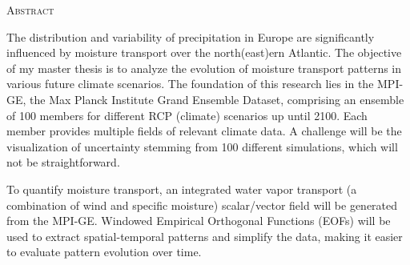 \begin{center}
  \textsc{Abstract}
\end{center}
%
\noindent
%
The distribution and variability of precipitation in Europe are significantly influenced by moisture transport over the north(east)ern Atlantic.
The objective of my master thesis is to analyze the evolution of moisture transport patterns in various future climate scenarios.
The foundation of this research lies in the MPI-GE, the Max Planck Institute Grand Ensemble Dataset, comprising an ensemble of 100 members for different RCP (climate) scenarios up until 2100.
Each member provides multiple fields of relevant climate data.
A challenge will be the visualization of uncertainty stemming from 100 different simulations, which will not be straightforward.

To quantify moisture transport, an integrated water vapor transport (a combination of wind and specific moisture) scalar/vector field will be generated from the MPI-GE.
Windowed Empirical Orthogonal Functions (EOFs) will be used to extract spatial-temporal patterns and simplify the data, making it easier to evaluate pattern evolution over time.


